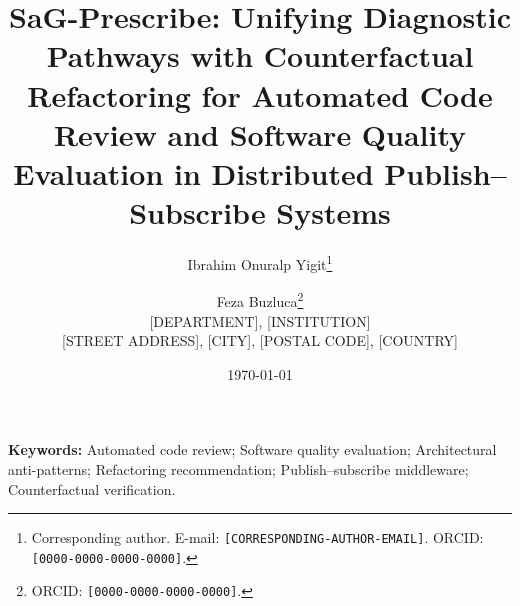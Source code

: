 \documentclass[11pt,a4paper]{article}
\title{\Large\bfseries SaG-Prescribe: Unifying Diagnostic Pathways with Counterfactual Refactoring for Automated Code Review and Software Quality Evaluation in Distributed Publish--Subscribe Systems}
\author{
  Ibrahim Onuralp Yigit\thanks{Corresponding author. E-mail: \texttt{[CORRESPONDING-AUTHOR-EMAIL]}. ORCID: \texttt{[0000-0000-0000-0000]}.}
  \and
  Feza Buzluca\thanks{ORCID: \texttt{[0000-0000-0000-0000]}.}
  \\[6pt]
  \normalsize [DEPARTMENT], [INSTITUTION] \\
  \normalsize [STREET ADDRESS], [CITY], [POSTAL CODE], [COUNTRY]
}
\date{\today}
\begin{document}
\maketitle

\begin{abstract}

\end{abstract}

\textbf{Keywords:} Automated code review; Software quality evaluation; Architectural anti-patterns; Refactoring recommendation; Publish--subscribe middleware; Counterfactual verification.

\linenumbers

















\end{document}
